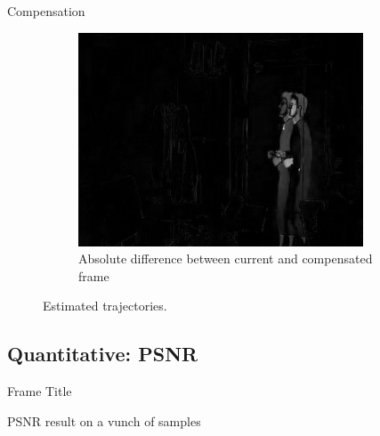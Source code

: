 \documentclass[aspectratio=1610,xcolor=dvipsnames]{beamer}
\begin{document}
\begin{frame}{Compensation}
\begin{figure}[htbp]
\begin{subfigure}[b]{0.3\textwidth}
            \includegraphics[width=.9\textwidth]{../assets/images/04-diff-curr-comp.png}
            \caption{Absolute difference between current and compensated frame}
            \label{fig:diff-curr-comp}
        \end{subfigure}
    
        \caption{Estimated trajectories.}
    \end{figure}
\end{frame}

\subsection{Quantitative: PSNR}
\begin{frame}{Frame Title}
    \begin{table}
        \label{tab:psnr}
        
        \caption{PSNR result on a vunch of samples}
    \end{table}    
\end{frame}
\end{document}
